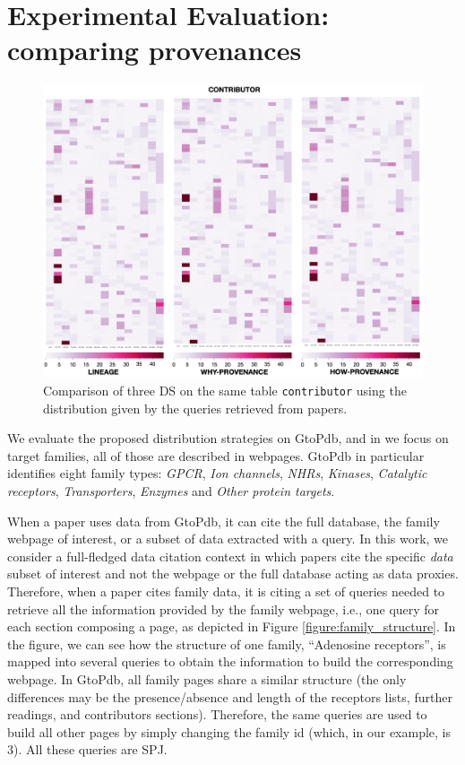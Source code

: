 \section{Experimental Evaluation: comparing provenances}
\label{sec:experiments}

\begin{figure}[t]
  \includegraphics[width=1\textwidth]{figures/paper_based_comparison}
  \caption{Comparison of three DS on the same table \texttt{contributor} using the distribution given by the queries retrieved from papers.}
  \label{figure:comparison_on_papers}
\end{figure}

We evaluate the proposed distribution strategies on GtoPdb, and in we focus on target families, all of those are described in webpages. 
GtoPdb in particular identifies eight family types: \emph{GPCR}, \emph{Ion channels}, \emph{NHRs}, \emph{Kinases}, \emph{Catalytic receptors}, \emph{Transporters}, \emph{Enzymes} and \emph{Other protein targets}.  

When a paper uses data from GtoPdb, it can cite the full database, the family webpage of interest, or a subset of data extracted with a query. 
In this work, we consider a full-fledged data citation context in which papers cite the specific \emph{data} subset of interest and not the webpage or the full database acting as data proxies.  
Therefore, when a paper cites family data, it is citing a set of queries needed to retrieve all the information provided by the family webpage, i.e., one query for each section composing a page, as depicted in Figure \ref{figure:family_structure}. 
In the figure, we can see how the structure of one family, ``Adenosine receptors'', is mapped into several queries to obtain the information to build the corresponding webpage. 
In GtoPdb, all family pages share a similar structure (the only differences may be the presence/absence and length of the receptors lists, further readings, and contributors sections).
Therefore, the same queries are used to build all other pages by simply changing the family id (which, in our example, is 3). All these queries are SPJ. 

